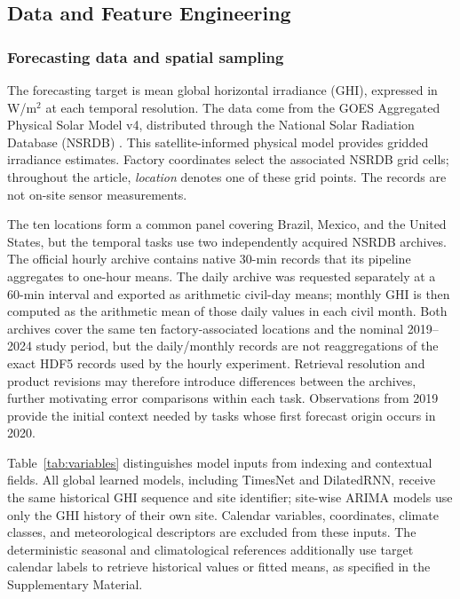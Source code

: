 \subsection{Data and Feature Engineering}
\label{sec:data}

\subsubsection{Forecasting data and spatial sampling}

The forecasting target is mean global horizontal irradiance (GHI), expressed
in W/m$^2$ at each temporal resolution. The data come from the GOES Aggregated
Physical Solar Model v4, distributed through the National Solar Radiation
Database (NSRDB) \cite{sengupta2018,nlr2026}. This satellite-informed physical
model provides gridded irradiance estimates. Factory coordinates select the
associated NSRDB grid cells; throughout the article, \emph{location} denotes
one of these grid points. The records are not on-site sensor measurements.

The ten locations form a common panel covering Brazil, Mexico, and the United
States, but the temporal tasks use two independently acquired NSRDB archives.
The official hourly archive contains native 30-min records that its pipeline
aggregates to one-hour means. The daily archive was requested separately at a
60-min interval and exported as arithmetic civil-day means; monthly GHI is then
computed as the arithmetic mean of those daily values in each civil month.
Both archives cover the same ten factory-associated locations and the nominal
2019--2024 study period, but the daily/monthly records are not reaggregations of
the exact HDF5 records used by the hourly experiment. Retrieval resolution and product revisions may therefore introduce
differences between the archives, further motivating error comparisons
within each task. Observations from 2019 provide the initial context needed
by tasks whose first forecast origin occurs in 2020.

Table~\ref{tab:variables} distinguishes model inputs from indexing and
contextual fields. All global learned models, including TimesNet and
DilatedRNN, receive the same historical GHI sequence and site identifier;
site-wise ARIMA models use only the GHI history of their own site. Calendar
variables, coordinates, climate classes, and meteorological descriptors are
excluded from these inputs. The deterministic seasonal and climatological
references additionally
use target calendar labels to retrieve historical values or fitted means,
as specified in the Supplementary Material.

